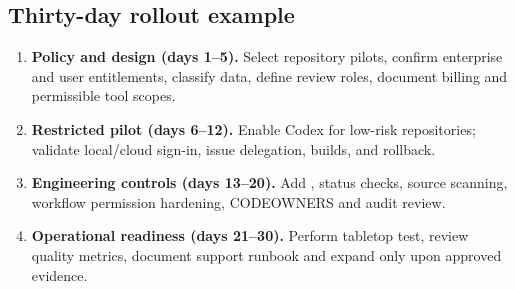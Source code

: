 \documentclass[11pt,letterpaper,oneside]{article}
\newcommand{\cmd}[1]{\path{#1}}
\begin{document}
\subsection{Thirty-day rollout example}
\begin{enumerate}[label=\textbf{Phase \arabic*.}]
\item \textbf{Policy and design (days 1--5).} Select repository pilots, confirm enterprise and user entitlements, classify data, define review roles, document billing and permissible tool scopes.
\item \textbf{Restricted pilot (days 6--12).} Enable Codex for low-risk repositories; validate local/cloud sign-in, issue delegation, builds, and rollback.
\item \textbf{Engineering controls (days 13--20).} Add \cmd{AGENTS.md}, status checks, source scanning, workflow permission hardening, CODEOWNERS and audit review.
\item \textbf{Operational readiness (days 21--30).} Perform tabletop test, review quality metrics, document support runbook and expand only upon approved evidence.
\end{enumerate}
\end{document}

